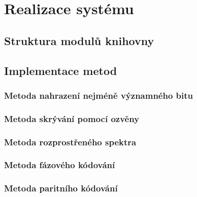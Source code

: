 \chapter{Realizace systému}
\label{cha:implementation}


\blindtext

\section{Struktura modulů knihovny}
\label{sec:modules}


\blindtext

\blindtext

\blindtext

\section{Implementace metod}
\label{sec:method-implementation}

\subsection*{Metoda nahrazení nejméně významného bitu}
\label{sub:lsb-implementation}

\blindtext

\subsection*{Metoda skrývání pomocí ozvěny}
\label{sub:echo-hiding-implementation}

\blindtext

\subsection*{Metoda rozprostřeného spektra}
\label{sub:dsss-implementation}

\blindtext

\subsection*{Metoda fázového kódování}
\label{sub:phase-coding-implementation}


\blindtext

\subsection*{Metoda paritního kódování}
\label{sub:parity-coding-implementation}

